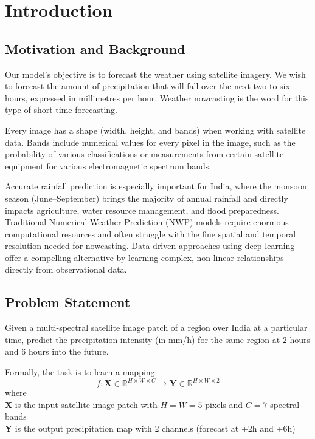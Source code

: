 \documentclass[12pt, a4paper]{report}
\begin{document}
\chapter{Introduction}

\section{Motivation and Background}

Our model's objective is to forecast the weather using satellite imagery. We wish to forecast the amount of precipitation that will fall over the next two to six hours, expressed in millimetres per hour. Weather nowcasting is the word for this type of short-time forecasting.

Every image has a shape (width, height, and bands) when working with satellite data. Bands include numerical values for every pixel in the image, such as the probability of various classifications or measurements from certain satellite equipment for various electromagnetic spectrum bands.

Accurate rainfall prediction is especially important for India, where the monsoon season (June--September) brings the majority of annual rainfall and directly impacts agriculture, water resource management, and flood preparedness. Traditional Numerical Weather Prediction (NWP) models require enormous computational resources and often struggle with the fine spatial and temporal resolution needed for nowcasting. Data-driven approaches using deep learning offer a compelling alternative by learning complex, non-linear relationships directly from observational data.

\section{Problem Statement}

Given a multi-spectral satellite image patch of a region over India at a particular time, predict the precipitation intensity (in mm/h) for the same region at 2 hours and 6 hours into the future.

Formally, the task is to learn a mapping:
\begin{equation}
    f: \mathbf{X} \in \mathbb{R}^{H \times W \times C} \rightarrow \mathbf{Y} \in \mathbb{R}^{H \times W \times 2}
    \label{eq:problem_statement}
\end{equation}
where \\
$\mathbf{X}$ is the input satellite image patch with $H = W = 5$ pixels and $C = 7$ spectral bands\\
$\mathbf{Y}$ is the output precipitation map with 2 channels (forecast at +2h and +6h)
\end{document}
